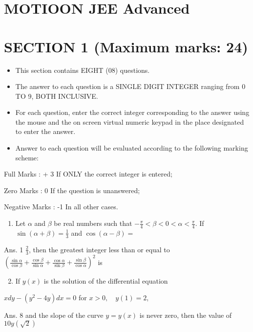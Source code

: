 \documentclass[10pt]{article}
\begin{document}
\section{MOTIOON JEE Advanced}
\section{SECTION 1 (Maximum marks: 24)}
\begin{itemize}
  \item This section contains EIGHT (08) questions.

  \item The answer to each question is a SINGLE DIGIT INTEGER ranging from 0 TO 9, BOTH INCLUSIVE.

  \item For each question, enter the correct integer corresponding to the answer using the mouse and the on screen virtual numeric keypad in the place designated to enter the answer.

  \item Answer to each question will be evaluated according to the following marking scheme:

\end{itemize}

Full Marks : + 3 If ONLY the correct integer is entered;

Zero Marks : 0 If the question is unanswered;

Negative Marks : -1 In all other cases.

\begin{enumerate}
  \item Let $\alpha$ and $\beta$ be real numbers such that $-\frac{\pi}{4}<\beta<0<\alpha<\frac{\pi}{4}$. If $\sin (\alpha+\beta)=\frac{1}{3}$ and $\cos (\alpha-\beta)=$
\end{enumerate}

Ans. 1 $\frac{2}{3}$, then the greatest integer less than or equal to $\left(\frac{\sin \alpha}{\cos \beta}+\frac{\cos \beta}{\sin \alpha}+\frac{\cos \alpha}{\sin \beta}+\frac{\sin \beta}{\cos \alpha}\right)^{2}$ is

\begin{enumerate}
  \setcounter{enumi}{1}
  \item If $y(x)$ is the solution of the differential equation
\end{enumerate}

$x d y-\left(y^{2}-4 y\right) d x=0$ for $x>0, \quad y(1)=2$,

Ans. 8 and the slope of the curve $y=y(x)$ is never zero, then the value of $10 y(\sqrt{2})$
\end{document}
